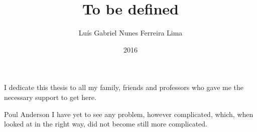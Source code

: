 \documentclass[en,twoside,onehalfspacing,msc]{risethesis}
\title{To be defined}
\date{2016}
\author{Luís Gabriel Nunes Ferreira Lima}
\begin{document}
\frontmatter

\frontpage

\presentationpage

\begin{fichacatalografica}
	\FakeFichaCatalografica %
\end{fichacatalografica}

\banca

\begin{dedicatory}
I dedicate this thesis to all my family, friends and professors who gave me the
necessary support to get here.
\end{dedicatory}

\acknowledgements


\begin{epigraph}[]{Poul Anderson}
I have yet to see any problem, however complicated, which, when looked at in the
right way, did not become still more complicated.
\end{epigraph}

\resumo


\abstract


\listoffigures

\listoftables

\lstlistoflistings

\listofacronyms


\tableofcontents

\mainmatter









\begin{references}
  
\end{references}

\theappendix

\end{document}
